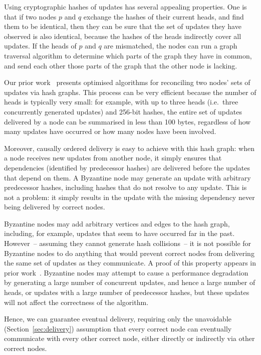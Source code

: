\documentclass[sigplan,review]{acmart}
\begin{document}
Using cryptographic hashes of updates has several appealing properties.
One is that if two nodes $p$ and $q$ exchange the hashes of their current heads, and find them to be identical, then they can be sure that the set of updates they have observed is also identical, because the hashes of the heads indirectly cover all updates.
If the heads of $p$ and $q$ are mismatched, the nodes can run a graph traversal algorithm to determine which parts of the graph they have in common, and send each other those parts of the graph that the other node is lacking.

Our prior work~\cite{BECPreprint} presents optimised algorithms for reconciling two nodes' sets of updates via hash graphs.
This process can be very efficient because the number of heads is typically very small: for example, with up to three heads (i.e.\ three concurrently generated updates) and 256-bit hashes, the entire set of updates delivered by a node can be summarised in less than 100 bytes, regardless of how many updates have occurred or how many nodes have been involved.

Moreover, causally ordered delivery is easy to achieve with this hash graph: when a node receives new updates from another node, it simply ensures that dependencies (identified by predecessor hashes) are delivered before the updates that depend on them.
A Byzantine node may generate an update with arbitrary predecessor hashes, including hashes that do not resolve to any update.
This is not a problem: it simply results in the update with the missing dependency never being delivered by correct nodes.

Byzantine nodes may add arbitrary vertices and edges to the hash graph, including, for example, updates that seem to have occurred far in the past.
However~-- assuming they cannot generate hash collisions~-- it is not possible for Byzantine nodes to do anything that would prevent correct nodes from delivering the same set of updates as they communicate.
A proof of this property appears in prior work~\cite{BECPreprint}.
Byzantine nodes may attempt to cause a performance degradation by generating a large number of concurrent updates, and hence a large number of heads, or updates with a large number of predecessor hashes, but these updates will not affect the correctness of the algorithm.

Hence, we can guarantee eventual delivery, requiring only the unavoidable (Section~\ref{sec:delivery}) assumption that every correct node can eventually communicate with every other correct node, either directly or indirectly via other correct nodes.
\end{document}
